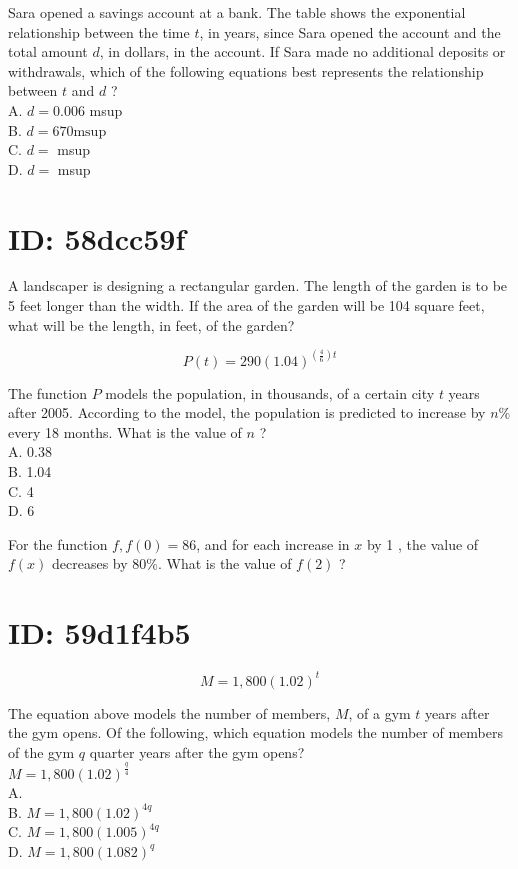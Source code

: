 Sara opened a savings account at a bank. The table shows the exponential relationship between the time $t$, in years, since Sara opened the account and the total amount $d$, in dollars, in the account. If Sara made no additional deposits or withdrawals, which of the following equations best represents the relationship between $t$ and $d$ ?\\
A. $d=0.006$ msup\\
B. $d=670 \mathrm{msup}$\\
C. $d=$ msup\\
D. $d=$ msup

\section*{ID: 58dcc59f}
A landscaper is designing a rectangular garden. The length of the garden is to be 5 feet longer than the width. If the area of the garden will be 104 square feet, what will be the length, in feet, of the garden?

$$
P(t)=290(1.04)^{\left(\frac{4}{6}\right) t}
$$

The function $P$ models the population, in thousands, of a certain city $t$ years after 2005. According to the model, the population is predicted to increase by $n \%$ every 18 months. What is the value of $n$ ?\\
A. 0.38\\
B. 1.04\\
C. 4\\
D. 6

For the function $f, f(0)=86$, and for each increase in $x$ by 1 , the value of $f(x)$ decreases by $80 \%$. What is the value of $f(2)$ ?

\section*{ID: 59d1f4b5}
$$
M=1,800(1.02)^{t}
$$

The equation above models the number of members, $M$, of a gym $t$ years after the gym opens. Of the following, which equation models the number of members of the gym $q$ quarter years after the gym opens?\\
$M=1,800(1.02)^{\frac{q}{4}}$\\
A.\\
B. $M=1,800(1.02)^{4 q}$\\
C. $M=1,800(1.005)^{4 q}$\\
D. $M=1,800(1.082)^{q}$

